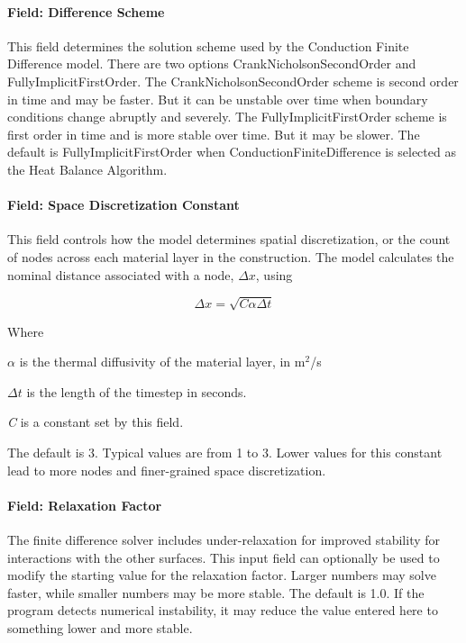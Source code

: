 \paragraph{Field: Difference Scheme}\label{field-difference-scheme}

This field determines the solution scheme used by the Conduction Finite Difference model. There are two options CrankNicholsonSecondOrder and FullyImplicitFirstOrder. The CrankNicholsonSecondOrder scheme is second order in time and may be faster. But it can be unstable over time when boundary conditions change abruptly and severely. The FullyImplicitFirstOrder scheme is first order in time and is more stable over time. But it may be slower. The default is FullyImplicitFirstOrder when ConductionFiniteDifference is selected as the Heat Balance Algorithm.

\paragraph{Field: Space Discretization Constant}\label{field-space-discretization-constant}

This field controls how the model determines spatial discretization, or the count of nodes across each material layer in the construction. The model calculates the nominal distance associated with a node, \(\Delta x\), using

\begin{equation}
    \Delta x = \sqrt {C\alpha \Delta t}
\end{equation}

Where

\(\alpha\) is the thermal diffusivity of the material layer, in m\(^{2}\)/s

\(\Delta t\) is the length of the timestep in seconds.

\emph{C} is a constant set by this field.

The default is 3. Typical values are from 1 to 3. Lower values for this constant lead to more nodes and finer-grained space discretization.

\paragraph{Field: Relaxation Factor}\label{field-relaxation-factor}

The finite difference solver includes under-relaxation for improved stability for interactions with the other surfaces. This input field can optionally be used to modify the starting value for the relaxation factor. Larger numbers may solve faster, while smaller numbers may be more stable. The default is 1.0. If the program detects numerical instability, it may reduce the value entered here to something lower and more stable.

